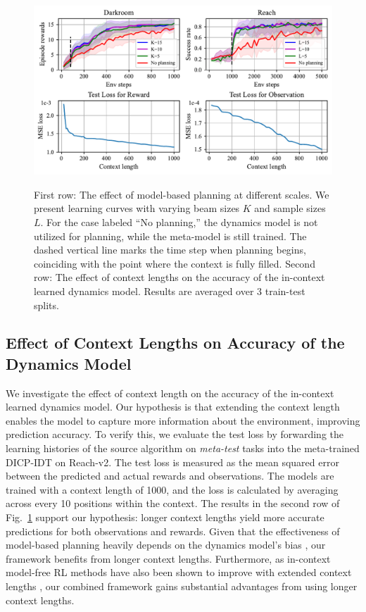 \documentclass{article}
\begin{document}
\begin{figure}[t!]
    \begin{center}
        \includegraphics[width=\linewidth]{figures/ablation.pdf} \\
    \end{center}
    \caption{
    First row: The effect of model-based planning at different scales.
    We present learning curves with varying beam sizes $K$ and sample sizes $L$.
    For the case labeled ``No planning,'' the dynamics model is not utilized for planning, while the meta-model is still trained.
    The dashed vertical line marks the time step when planning begins, coinciding with the point where the context is fully filled.
    Second row: The effect of context lengths on the accuracy of the in-context learned dynamics model.
    Results are averaged over 3 train-test splits.
    }
    \label{fig:ablation}
\end{figure}

\subsection{Effect of Context Lengths on Accuracy of the Dynamics Model}
\label{sec:ablation:context}

We investigate the effect of context length on the accuracy of the in-context learned dynamics model.
Our hypothesis is that extending the context length enables the model to capture more information about the environment, improving prediction accuracy.
To verify this, we evaluate the test loss by forwarding the learning histories of the source algorithm on \emph{meta-test} tasks into the meta-trained DICP-IDT on Reach-v2.
The test loss is measured as the mean squared error between the predicted and actual rewards and observations.
The models are trained with a context length of 1000, and the loss is calculated by averaging across every 10 positions within the context.
The results in the second row of Fig.~\ref{fig:ablation} support our hypothesis: longer context lengths yield more accurate predictions for both observations and rewards.
Given that the effectiveness of model-based planning heavily depends on the dynamics model's bias \citep{MBPO, M3PO}, our framework benefits from longer context lengths.
Furthermore, as in-context model-free RL methods have also been shown to improve with extended context lengths \citep{AD}, our combined framework gains substantial advantages from using longer context lengths.
\end{document}
